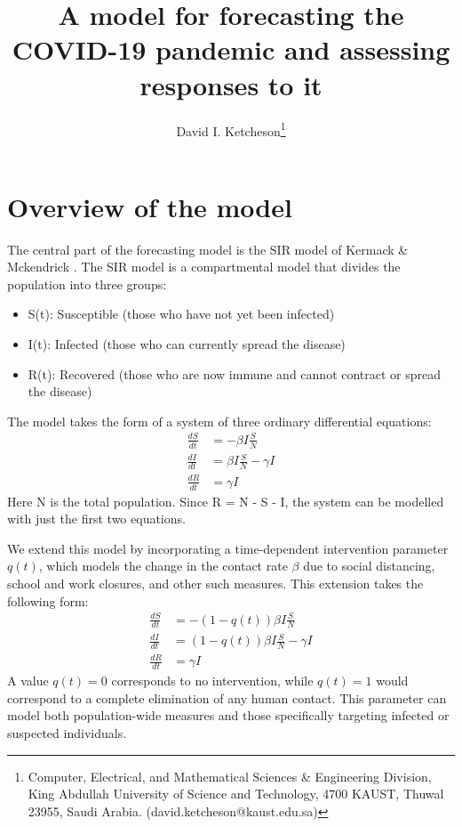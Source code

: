 \documentclass[english,12pt,letter]{article}
\begin{document}
\title{A model for forecasting the COVID-19 pandemic and assessing responses to it}
\author{
  David I. Ketcheson\thanks{Computer, Electrical, and Mathematical Sciences \& Engineering Division,
King Abdullah University of Science and Technology, 4700 KAUST, Thuwal
23955, Saudi Arabia. (david.ketcheson@kaust.edu.sa)}
}
\maketitle


\section{Overview of the model}

The central part of the forecasting model is the SIR model of Kermack \&
Mckendrick \cite{kermack1927contribution}. The SIR model is a compartmental model
that divides the population into three groups:
\begin{itemize}
  \item S(t): Susceptible (those who have not yet been infected)
  \item I(t): Infected (those who can currently spread the disease)
  \item R(t): Recovered (those who are now immune and cannot contract or spread the disease)
\end{itemize}
The model takes the form of a system of three ordinary differential
equations:
\begin{align}
\frac{dS}{dt} & = -\beta I \frac{S}{N} \\
\frac{dI}{dt} & = \beta I \frac{S}{N}-\gamma I \\
\frac{dR}{dt} & = \gamma I
\end{align}
Here N is the total population.  Since R = N - S - I, the system can be modelled with just
the first two equations.

We extend this model by incorporating a time-dependent intervention parameter $q(t)$,
which models the change in the contact rate $\beta$ due to social distancing, school
and work closures, and other such measures.  This extension takes the following
form:
\begin{align}
\frac{dS}{dt} & = -(1-q(t))\beta I \frac{S}{N} \\
\frac{dI}{dt} & = (1-q(t))\beta I \frac{S}{N}-\gamma I \\
\frac{dR}{dt} & = \gamma I
\end{align}
A value $q(t)=0$ corresponds to no intervention, while $q(t)=1$ would correspond
to a complete elimination of any human contact.  This parameter can model both
population-wide measures and those specifically targeting infected or suspected
individuals.
\end{document}
